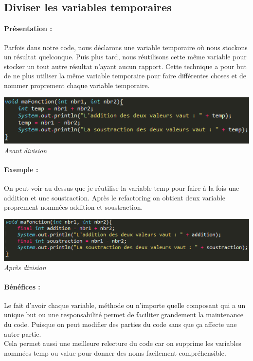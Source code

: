 \documentclass[a4paper,twoside,12pt,openright]{report}
\begin{document}
\newpage

\subsection{Diviser les variables temporaires}
\paragraph{Présentation :}
Parfois dans notre code, nous déclarons une variable temporaire où nous stockons un résultat quelconque. Puis plus tard, nous réutilisons cette même variable pour stocker un tout autre résultat n'ayant aucun rapport.
Cette technique a pour but de ne plus utiliser la même variable temporaire pour faire différentes choses et de nommer proprement chaque variable temporaire.

\begin{center}
\includegraphics[scale=1]{Image/Diviser_Temp.png}\\
\itshape{Avant division}
\end{center}

\paragraph{Exemple :}
On peut voir au dessus que je réutilise la variable temp pour faire à la fois une addition et une soustraction. Après le refactoring on obtient deux variable proprement nommées addition et soustraction.

\begin{center}
\includegraphics[scale=1]{Image/Diviser_Temp2.png}\\
\itshape{Après division}
\end{center}

\paragraph{Bénéfices :}
Le fait d'avoir chaque variable, méthode ou n'importe quelle composant qui a un unique but ou une responsabilité permet de faciliter grandement la maintenance du code. Puisque on peut modifier des parties du code sans que ça affecte une autre partie.\\
Cela permet aussi une meilleure relecture du code car on supprime les variables nommées temp ou value pour donner des noms facilement compréhensible.\\
\end{document}
